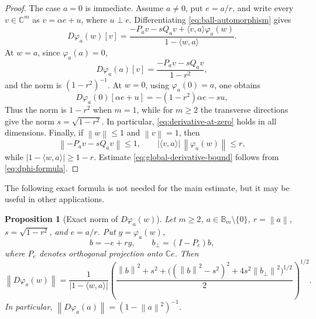 \documentclass[11pt]{amsart}
\newtheorem{proposition}[theorem]{Proposition}
\theoremstyle{definition}
\theoremstyle{remark}
\newcommand{\C}{\mathbb C}
\newcommand{\B}{\mathbb B}
\newcommand{\inner}[2]{\langle #1,#2\rangle}
\newcommand{\norm}[1]{\left\|#1\right\|}
\begin{document}
\begin{proof}
The case \(a=0\) is immediate. Assume \(a\ne0\), put \(e=a/r\), and write every \(v\in\C^m\) as \(v=\alpha e+u\), where \(u\perp e\). Differentiating \eqref{eq:ball-automorphism} gives
\begin{equation}\label{eq:dphi-formula}
        D\varphi_a(w)[v]
        =
        \frac{-P_av-sQ_av+\inner{v}{a}\varphi_a(w)}{1-\inner{w}{a}}.
\end{equation}
At \(w=a\), since \(\varphi_a(a)=0\),
\[
        D\varphi_a(a)[v]
        =
        \frac{-P_av-sQ_av}{1-r^2},
\]
and the norm is \((1-r^2)^{-1}\). At \(w=0\), using \(\varphi_a(0)=a\), one obtains
\[
        D\varphi_a(0)[\alpha e+u]
        =-(1-r^2)\alpha e-su,
\]
Thus the norm is \(1-r^2\) when \(m=1\), while for \(m\ge2\) the transverse directions give the norm \(s=\sqrt{1-r^2}\). In particular, \eqref{eq:derivative-at-zero} holds in all dimensions. Finally, if \(\norm{w}\le1\) and \(\norm{v}=1\), then
\[
        \norm{-P_av-sQ_av}\le1,
        \qquad
        |\inner{v}{a}|\,\norm{\varphi_a(w)}\le r,
\]
while \(|1-\inner{w}{a}|\ge1-r\). Estimate \eqref{eq:global-derivative-bound} follows from \eqref{eq:dphi-formula}.
\end{proof}

The following exact formula is not needed for the main estimate, but it may be useful in other applications.

\begin{proposition}[Exact norm of \(D\varphi_a(w)\)]\label{prop:exact-automorphism-norm}
Let \(m\ge2\), \(a\in\B_m\setminus\{0\}\), \(r=\norm{a}\), \(s=\sqrt{1-r^2}\), and \(e=a/r\). Put \(y=\varphi_a(w)\),
\[
        b=-e+ry,
        \qquad b_\perp=(I-P_e)b,
\]
where \(P_e\) denotes orthogonal projection onto \(\C e\). Then
\begin{equation}\label{eq:exact-automorphism-norm}
\norm{D\varphi_a(w)}
=
\frac{1}{|1-\inner{w}{a}|}
\left(
\frac{
\norm{b}^2+s^2+\big((\norm{b}^2-s^2)^2+4s^2\norm{b_\perp}^2\big)^{1/2}
}{2}
\right)^{1/2}.
\end{equation}
In particular, \(\norm{D\varphi_a(a)}=(1-\norm{a}^2)^{-1}\).
\end{proposition}
\end{document}
